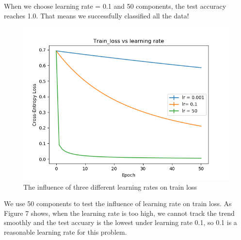\documentclass{article} %
\begin{document}
When we choose learning rate = 0.1 and 50 components, the test accuracy reaches 1.0. That means we successfully classified all the data!\\
\begin{figure}[h]
	\centering
	\includegraphics[scale=0.5]{./graph/diff_lr.png}
	\caption{The influence of three different learning rates on train loss}
\end{figure}
We use 50 components to test the influence of learning rate on train loss. As Figure 7 shows, when the learning rate is too high, we cannot track the trend smoothly and the test accuary is the lowest under learning rate 0.1, so 0.1 is a reasonable learning rate for this problem.
\end{document}
